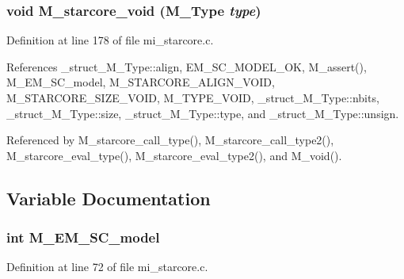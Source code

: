 \subsubsection{\setlength{\rightskip}{0pt plus 5cm}void M\_\-starcore\_\-void (\bf{M\_\-Type} {\em type})}\label{m__starcore_8h_5f5f744afe38121c2fac26ff804bd199}




Definition at line 178 of file mi\_\-starcore.c.

References \_\-struct\_\-M\_\-Type::align, EM\_\-SC\_\-MODEL\_\-OK, M\_\-assert(), M\_\-EM\_\-SC\_\-model, M\_\-STARCORE\_\-ALIGN\_\-VOID, M\_\-STARCORE\_\-SIZE\_\-VOID, M\_\-TYPE\_\-VOID, \_\-struct\_\-M\_\-Type::nbits, \_\-struct\_\-M\_\-Type::size, \_\-struct\_\-M\_\-Type::type, and \_\-struct\_\-M\_\-Type::unsign.

Referenced by M\_\-starcore\_\-call\_\-type(), M\_\-starcore\_\-call\_\-type2(), M\_\-starcore\_\-eval\_\-type(), M\_\-starcore\_\-eval\_\-type2(), and M\_\-void().

\subsection{Variable Documentation}
\subsubsection{\setlength{\rightskip}{0pt plus 5cm}int \bf{M\_\-EM\_\-SC\_\-model}}\label{m__starcore_8h_f27aeebffb573dd84524682cb99247cc}




Definition at line 72 of file mi\_\-starcore.c.

